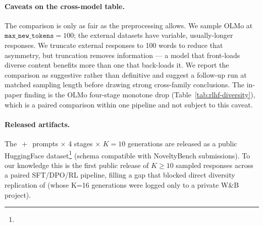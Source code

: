 \paragraph{Caveats on the cross-model table.} The comparison is only as fair as the preprocessing allows. We sample OLMo at $\texttt{max\_new\_tokens}{=}100$; the external datasets have variable, usually-longer responses. We truncate external responses to 100 words to reduce that asymmetry, but truncation removes information --- a model that front-loads diverse content benefits more than one that back-loads it. We report the comparison as suggestive rather than definitive and suggest a follow-up run at matched sampling length before drawing strong cross-family conclusions. The in-paper finding is the OLMo four-stage monotone drop (Table~\ref{tab:rlhf-diversity}), which is a paired comparison within one pipeline and not subject to this caveat.

\paragraph{Released artifacts.} The \olmoAlpacaN$\,+\,$\olmoNbCuratedN{} prompts $\times$ 4 stages $\times$ $K{=}10$ generations are released as a public HuggingFace dataset\footnote{\projectHfDatasetUrl} (schema compatible with NoveltyBench submissions). To our knowledge this is the first public release of $K\!\ge\!10$ sampled responses across a paired SFT/DPO/RL pipeline, filling a gap that blocked direct diversity replication of \citet{kirk2023rlhf} (whose K=16 generations were logged only to a private W\&B project).

\providecommand{\olmoAlpacaN}{200}
\providecommand{\olmoNbCuratedN}{100}
\providecommand{\olmoAlpacaBaseDMean}{??}
\providecommand{\olmoAlpacaSftDMean}{??}
\providecommand{\olmoAlpacaDpoDMean}{??}
\providecommand{\olmoAlpacaInstructDMean}{??}
\providecommand{\olmoAlpacaHoneADz}{??}
\providecommand{\olmoAlpacaHoneAPbonf}{??}
\providecommand{\olmoAlpacaHoneBDz}{??}
\providecommand{\olmoAlpacaHoneBPbonf}{??}
\providecommand{\olmoAlpacaHoneCDz}{??}
\providecommand{\olmoAlpacaHoneCPbonf}{??}
\providecommand{\olmoAlpacaHpaDiff}{??}
\providecommand{\olmoAlpacaHpaDz}{??}
\providecommand{\olmoNbCuratedBaseDMean}{??}
\providecommand{\olmoNbCuratedSftDMean}{??}
\providecommand{\olmoNbCuratedDpoDMean}{??}
\providecommand{\olmoNbCuratedInstructDMean}{??}
\providecommand{\olmoNbCuratedHoneADz}{??}
\providecommand{\olmoNbCuratedHoneAPbonf}{??}
\providecommand{\olmoNbCuratedHoneBDz}{??}
\providecommand{\olmoNbCuratedHoneBPbonf}{??}
\providecommand{\olmoNbCuratedHoneCDz}{??}
\providecommand{\olmoNbCuratedHoneCPbonf}{??}

